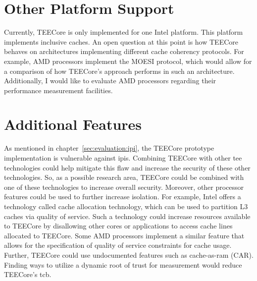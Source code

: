 \section{Other Platform Support}
Currently, TEECore is only implemented for one Intel platform. This platform
implements inclusive caches. An open question at this point is how TEECore
behaves on architectures implementing different cache coherency protocols. For
example, AMD processors implement the MOESI protocol, which would allow for a
comparison of how TEECore's approach performs in such an architecture.
Additionally, I would like to evaluate AMD processors regarding their
performance measurement facilities.

\section{Additional Features}
As mentioned in chapter~\ref{sec:evaluation:ipi}, the TEECore prototype
implementation is vulnerable against \glspl{ipi}. Combining TEECore with other
\gls{tee} technologies could help mitigate this flaw and increase the security
of these other technologies. So, as a possible research area, TEECore could be
combined with one of these technologies to increase overall security. Moreover,
other processor features could be used to further increase isolation. For
example, Intel offers a technology called cache allocation technology, which can
be used to partition L3 caches via quality of service. Such a technology could
increase resources available to TEECore by disallowing other cores or
applications to access cache lines allocated to TEECore. Some AMD processors
implement a similar feature that allows for the specification of quality of
service constraints for cache usage. Further, TEECore could use undocumented
features such as cache-as-ram (CAR). Finding ways to utilize a dynamic root of
trust for measurement would reduce TEECore's \gls{tcb}.

